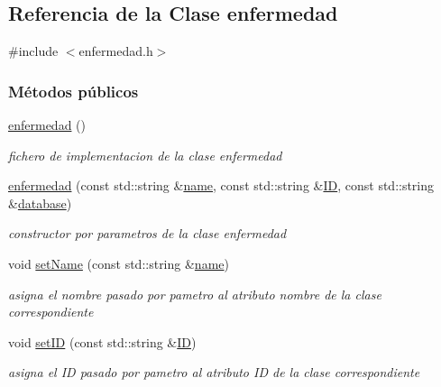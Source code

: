 \hypertarget{classenfermedad}{}\subsection{Referencia de la Clase enfermedad}
\label{classenfermedad}


{\ttfamily \#include $<$enfermedad.\+h$>$}

\subsubsection*{Métodos públicos}
\begin{DoxyCompactItemize}
\item 
\hyperlink{classenfermedad_a60eb5e620b0bf9a53d4f0980031aeefd}{enfermedad} ()
\begin{DoxyCompactList}\small\item\em fichero de implementacion de la clase enfermedad \end{DoxyCompactList}\item 
\hyperlink{classenfermedad_a74974a6c9090d3e21253922941c9d2bb}{enfermedad} (const std\+::string \&\hyperlink{classenfermedad_a02b17e98f7d0d3ecc3e54f23fbd897da}{name}, const std\+::string \&\hyperlink{classenfermedad_ac19bf47d78f91e0c9dd3c84339d250b4}{ID}, const std\+::string \&\hyperlink{classenfermedad_a4c33267847aebecf5bd7eb52b78e5da5}{database})
\begin{DoxyCompactList}\small\item\em constructor por parametros de la clase enfermedad \end{DoxyCompactList}\item 
void \hyperlink{classenfermedad_a3984e324b78ca9609a34a576e2382193}{set\+Name} (const std\+::string \&\hyperlink{classenfermedad_a02b17e98f7d0d3ecc3e54f23fbd897da}{name})
\begin{DoxyCompactList}\small\item\em asigna el nombre pasado por pametro al atributo nombre de la clase correspondiente \end{DoxyCompactList}\item 
void \hyperlink{classenfermedad_ae5e527ceaf71f090cb945152c403eda3}{set\+ID} (const std\+::string \&\hyperlink{classenfermedad_ac19bf47d78f91e0c9dd3c84339d250b4}{ID})
\begin{DoxyCompactList}\small\item\em asigna el ID pasado por pametro al atributo ID de la clase correspondiente \end{DoxyCompactList}\item 

\end{DoxyCompactItemize}
